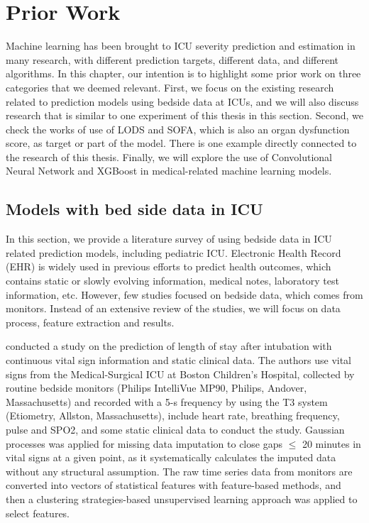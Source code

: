\documentclass[12pt,a4paper,english
]{tunithesis}
\begin{document}



\chapter{Prior Work}
\label{ch:priorwork}
Machine learning has been brought to ICU severity prediction and estimation in many research, with different prediction targets, different data, and different algorithms. In this chapter, our intention is to highlight some prior work on three categories that we deemed relevant. First, we focus on the existing research related to prediction models using bedside data at ICUs, and we will also discuss research that is similar to one experiment of this thesis in this section. Second, we check the works of use of LODS and SOFA, which is also an organ dysfunction score, as target or part of the model. There is one example directly connected to the research of this thesis. Finally, we will explore the use of Convolutional Neural Network and XGBoost in medical-related machine learning models. 

\section{Models with bed side data in ICU}
In this section, we provide a literature survey of using bedside data in ICU related prediction models, including pediatric ICU. Electronic Health Record (EHR) is widely used in previous efforts to predict health outcomes, which contains static or slowly evolving information, medical notes, laboratory test information, etc. However, few studies focused on bedside data, which comes from monitors. Instead of an extensive review of the studies, we will focus on data process, feature extraction and results.

\textcite{mitdavid2020} conducted a study on the prediction of length of stay after intubation with continuous vital sign information and static clinical data. The authors use vital signs from the Medical-Surgical ICU at Boston Children's Hospital, collected by routine bedside monitors (Philips IntelliVue MP90, Philips, Andover, Massachusetts) and recorded with a 5-s frequency by using the T3 system (Etiometry, Allston, Massachusetts), include heart rate, breathing frequency, pulse and SPO2, and some static clinical data to conduct the study. Gaussian processes was applied for missing data imputation to close gaps $\leq$ 20 minutes in vital signs at a given point, as it systematically calculates the imputed data without any structural assumption. The raw time series data from monitors are converted into vectors of statistical features with feature-based methods, and then a clustering strategies-based unsupervised learning approach was applied to select features.
\end{document}
